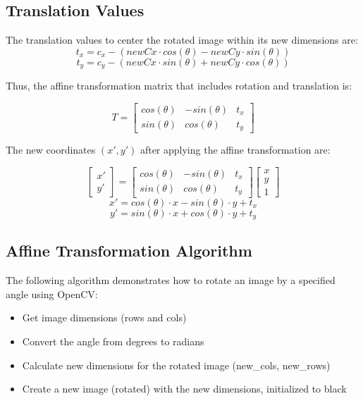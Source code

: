 \documentclass[conference]{IEEEtran}
\begin{document}
\subsection*{Translation Values}
The translation values to center the rotated image within its new dimensions are:
$$
t_x = c_x - (newCx \cdot cos(\theta) - newCy \cdot sin(\theta))
$$
$$
t_y = c_y - (newCx \cdot sin(\theta) + newCy \cdot cos(\theta))
$$

Thus, the affine transformation matrix that includes rotation and translation is:

$$
T = \begin{bmatrix}
cos(\theta) & -sin(\theta) & t_x \\
sin(\theta) & cos(\theta) & t_y
\end{bmatrix}
$$

The new coordinates \((x', y')\) after applying the affine transformation are:

$$
\begin{bmatrix}
x' \\
y'
\end{bmatrix}
=
\begin{bmatrix}
cos(\theta) & -sin(\theta) & t_x \\
sin(\theta) & cos(\theta) & t_y
\end{bmatrix}
\begin{bmatrix}
x \\
y \\
1
\end{bmatrix}
$$
$$ x' = cos(\theta) \cdot x - sin(\theta) \cdot y + t_x $$
$$ y' = sin(\theta) \cdot x + cos(\theta) \cdot y + t_y $$

\subsection{Affine Transformation Algorithm}
The following algorithm demonstrates how to rotate an image by a specified angle using OpenCV:
\begin{itemize}
\item Get image dimensions (rows and cols)
\item Convert the angle from degrees to radians
\item Calculate new dimensions for the rotated image (new\_cols, new\_rows)
\item Create a new image (rotated) with the new dimensions, initialized to black
\end{itemize}
\end{document}
